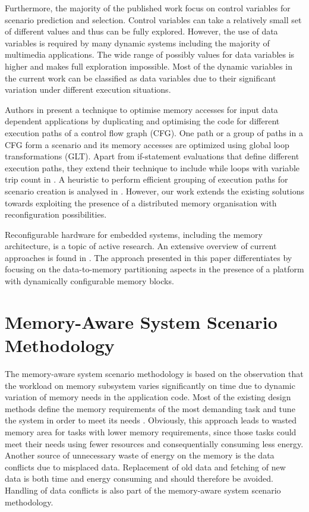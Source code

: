\documentclass[a4paper,conference]{IEEEtran}
\begin{document}
Furthermore, the majority of the published work focus on control variables for scenario prediction and selection. Control variables can take a relatively small set of different values and thus can be fully explored. However, the use of data variables \cite{Elena2010} is required by many dynamic systems including the majority of multimedia applications. The wide range of possibly values for data variables is higher and makes full exploration impossible. Most of the dynamic variables in the current work can be classified as data variables due to their significant variation under different execution situations. 

Authors in \cite{Pal06} present a technique to optimise memory accesses for input data dependent applications by duplicating and optimising the code for different execution paths of a control flow graph (CFG). One path or a group of paths in a CFG form a scenario and its memory accesses are optimized using global loop transformations (GLT). Apart from if-statement evaluations that define different execution paths, they extend their technique to include while loops with variable trip count in \cite{Pal06b}. A heuristic to perform efficient grouping of execution paths for scenario creation is analysed in \cite{Pal07}. However, our work extends the existing solutions towards exploiting the presence of a distributed memory organisation with reconfiguration possibilities.

Reconfigurable hardware for embedded systems, including the memory architecture, is a topic of active research. An extensive overview of current approaches is found in \cite{Garcia}. The approach presented in this paper differentiates by focusing on the data-to-memory partitioning aspects in the presence of a platform with dynamically configurable memory blocks. 

\section{Memory-Aware System Scenario Methodology}
\label{sec:methodology}

The memory-aware system scenario methodology is based on the observation that the workload on memory subsystem varies significantly on time due to dynamic variation of memory needs in the application code. Most of the existing design methods define the memory requirements of the most demanding task and tune the system in order to meet its needs \cite{tcm}. Obviously, this approach leads to wasted memory area for tasks with lower memory requirements, since those tasks could meet their needs using fewer resources and consequentially consuming less energy. Another source of unnecessary waste of energy on the memory is the data conflicts due to misplaced data. Replacement of old data and fetching of new data is both time and energy consuming and should therefore be avoided. Handling of data conflicts is also part of the  memory-aware system scenario methodology.
\end{document}
